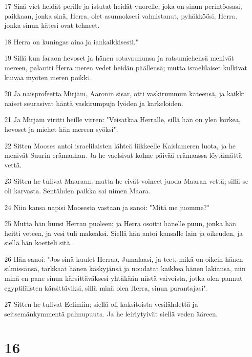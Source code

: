 \par 17 Sinä viet heidät perille ja istutat heidät vuorelle, joka on sinun perintöosasi, paikkaan, jonka sinä, Herra, olet asunnoksesi valmistanut, pyhäkköösi, Herra, jonka sinun kätesi ovat tehneet.
\par 18 Herra on kuningas aina ja iankaikkisesti."
\par 19 Sillä kun faraon hevoset ja hänen sotavaununsa ja ratsumiehensä menivät mereen, palautti Herra meren vedet heidän päällensä; mutta israelilaiset kulkivat kuivaa myöten meren poikki.
\par 20 Ja naisprofeetta Mirjam, Aaronin sisar, otti vaskirummun käteensä, ja kaikki naiset seurasivat häntä vaskirumpuja lyöden ja karkeloiden.
\par 21 Ja Mirjam viritti heille virren: "Veisatkaa Herralle, sillä hän on ylen korkea, hevoset ja miehet hän mereen syöksi".
\par 22 Sitten Mooses antoi israelilaisten lähteä liikkeelle Kaislameren luota, ja he menivät Suurin erämaahan. Ja he vaelsivat kolme päivää erämaassa löytämättä vettä.
\par 23 Sitten he tulivat Maaraan; mutta he eivät voineet juoda Maaran vettä; sillä se oli karvasta. Sentähden paikka sai nimen Maara.
\par 24 Niin kansa napisi Moosesta vastaan ja sanoi: "Mitä me juomme?"
\par 25 Mutta hän huusi Herran puoleen; ja Herra osoitti hänelle puun, jonka hän heitti veteen, ja vesi tuli makeaksi. Siellä hän antoi kansalle lain ja oikeuden, ja siellä hän koetteli sitä.
\par 26 Hän sanoi: "Jos sinä kuulet Herraa, Jumalaasi, ja teet, mikä on oikein hänen silmissänsä, tarkkaat hänen käskyjänsä ja noudatat kaikkea hänen lakiansa, niin minä en pane sinun kärsittäväksesi yhtäkään niistä vaivoista, jotka olen pannut egyptiläisten kärsittäviksi, sillä minä olen Herra, sinun parantajasi".
\par 27 Sitten he tulivat Eelimiin; siellä oli kaksitoista vesilähdettä ja seitsemänkymmentä palmupuuta. Ja he leiriytyivät siellä veden ääreen.

\chapter{16}

